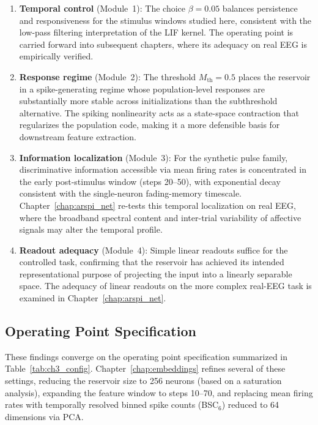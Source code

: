 \begin{enumerate}
    \item \textbf{Temporal control} (Module~1): The choice $\beta = 0.05$ balances persistence and responsiveness for the stimulus windows studied here, consistent with the low-pass filtering interpretation of the LIF kernel. The operating point is carried forward into subsequent chapters, where its adequacy on real EEG is empirically verified.

    \item \textbf{Response regime} (Module~2): The threshold $M_{\text{th}} = 0.5$ places the reservoir in a spike-generating regime whose population-level responses are substantially more stable across initializations than the subthreshold alternative. The spiking nonlinearity acts as a state-space contraction that regularizes the population code, making it a more defensible basis for downstream feature extraction.

    \item \textbf{Information localization} (Module~3): For the synthetic pulse family, discriminative information accessible via mean firing rates is concentrated in the early post-stimulus window (steps 20--50), with exponential decay consistent with the single-neuron fading-memory timescale. Chapter~\ref{chap:arspi_net} re-tests this temporal localization on real EEG, where the broadband spectral content and inter-trial variability of affective signals may alter the temporal profile.

    \item \textbf{Readout adequacy} (Module~4): Simple linear readouts suffice for the controlled task, confirming that the reservoir has achieved its intended representational purpose of projecting the input into a linearly separable space. The adequacy of linear readouts on the more complex real-EEG task is examined in Chapter~\ref{chap:arspi_net}.
\end{enumerate}

\subsection{Operating Point Specification}
\label{sec:validated_configuration}

These findings converge on the operating point specification summarized in Table~\ref{tab:ch3_config}. Chapter~\ref{chap:embeddings} refines several of these settings, reducing the reservoir size to 256 neurons (based on a saturation analysis), expanding the feature window to steps 10--70, and replacing mean firing rates with temporally resolved binned spike counts (BSC$_6$) reduced to 64 dimensions via PCA.

